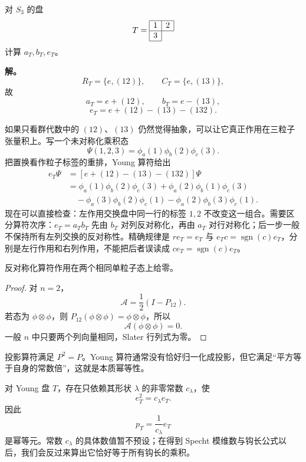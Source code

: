 \begin{workedexample}
对 $S_3$ 的盘
\[
T=\begin{array}{|c|c|}\hline1&2\\\hline3\\\cline{1-1}\end{array}
\]
计算 $a_T,b_T,e_T$。

\textbf{解。}
\[
R_T=\{e,(12)\},\qquad C_T=\{e,(13)\},
\]
故
\[
a_T=e+(12),\qquad b_T=e-(13),
\]
\[
e_T=e+(12)-(13)-(132).
\]
\end{workedexample}


如果只看群代数中的 $(12)$、$(13)$ 仍然觉得抽象，可以让它真正作用在三粒子张量积上。写一个未对称化乘积态
\[
\Psi(1,2,3)=\phi_a(1)\phi_b(2)\phi_c(3).
\]
把置换看作粒子标签的重排，Young 算符给出
\begin{align*}
e_T\Psi
&=[e+(12)-(13)-(132)]\Psi\\
&=\phi_a(1)\phi_b(2)\phi_c(3)
 +\phi_a(2)\phi_b(1)\phi_c(3)\\
&\quad-\phi_a(3)\phi_b(2)\phi_c(1)
 -\phi_a(2)\phi_b(3)\phi_c(1).
\end{align*}
现在可以直接检查：左作用交换盘中同一行的标签 $1,2$ 不改变这一组合。需要区分算符次序：$e_T=a_Tb_T$ 先由 $b_T$ 对列反对称化，再由 $a_T$ 对行对称化；后一步一般不保持所有左列交换的反对称性。精确规律是 $r e_T=e_T$ 与 $e_T c=\operatorname{sgn}(c)e_T$，分别是左行作用和右列作用，不能把后者误读成 $c e_T=\operatorname{sgn}(c)e_T$。

\begin{proposition}
反对称化算符作用在两个相同单粒子态上给零。
\end{proposition}

\begin{proof}
对 $n=2$，
\[
\mathcal A=\frac12(I-P_{12}).
\]
若态为 $\phi\otimes\phi$，则 $P_{12}(\phi\otimes\phi)=\phi\otimes\phi$，所以
\[
\mathcal A(\phi\otimes\phi)=0.
\]
一般 $n$ 中只要两个列向量相同，Slater 行列式为零。
\end{proof}


投影算符满足 $P^2=P$。Young 算符通常没有恰好归一化成投影，但它满足“平方等于自身的常数倍”，这就是本质幂等性。

\begin{theorem}
对 Young 盘 $T$，存在只依赖其形状 $\lambda$ 的非零常数 $c_\lambda$，使
\begin{equation}
e_T^2=c_\lambda e_T.
\label{eq:young-quasi-idempotent}
\end{equation}
因此
\[
p_T=\frac{1}{c_\lambda}e_T
\]
是幂等元。常数 $c_\lambda$ 的具体数值暂不预设；在得到 Specht 模维数与钩长公式以后，我们会反过来算出它恰好等于所有钩长的乘积。

\end{theorem}

